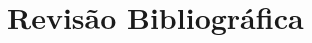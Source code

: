 \documentclass[
	article,			%
	10pt,				%
	oneside,			%
	a4paper,			%
	english,			%
	brazil,				%
	sumario=tradicional	
	]{abntex2}
\begin{document}
%
%
%
%

\section{Revisão Bibliográfica}
\end{document}

